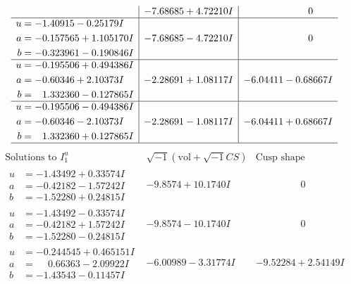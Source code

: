 \documentclass[1p]{elsarticle_modified}
\theoremstyle{definition}
\newcommand{\I}{\sqrt{-1}}
\begin{document}
$$\begin{array}{c|c|c}
 & -7.68685 + 4.72210 I & \phantom{-0.000000 } 0 \\ \hline\begin{aligned}
u &= -1.40915 - 0.25179 I \\
a &= -0.157565 + 1.105170 I \\
b &= -0.323961 - 0.190846 I\end{aligned}
 & -7.68685 - 4.72210 I & \phantom{-0.000000 } 0 \\ \hline\begin{aligned}
u &= -0.195506 + 0.494386 I \\
a &= -0.60346 + 2.10373 I \\
b &= \phantom{-}1.332360 - 0.127865 I\end{aligned}
 & -2.28691 + 1.08117 I & -6.04411 - 0.68667 I \\ \hline\begin{aligned}
u &= -0.195506 - 0.494386 I \\
a &= -0.60346 - 2.10373 I \\
b &= \phantom{-}1.332360 + 0.127865 I\end{aligned}
 & -2.28691 - 1.08117 I & -6.04411 + 0.68667 I\\
 \hline 
 \end{array}$$\newpage$$\begin{array}{c|c|c}  
\text{Solutions to }I^u_{1}& \I (\text{vol} + \sqrt{-1}CS) & \text{Cusp shape}\\
 \hline 
\begin{aligned}
u &= -1.43492 + 0.33574 I \\
a &= -0.42182 - 1.57242 I \\
b &= -1.52280 + 0.24815 I\end{aligned}
 & -9.8574 + 10.1740 I & \phantom{-0.000000 } 0 \\ \hline\begin{aligned}
u &= -1.43492 - 0.33574 I \\
a &= -0.42182 + 1.57242 I \\
b &= -1.52280 - 0.24815 I\end{aligned}
 & -9.8574 - 10.1740 I & \phantom{-0.000000 } 0 \\ \hline\begin{aligned}
u &= -0.244545 + 0.465151 I \\
a &= \phantom{-}0.66363 - 2.09922 I \\
b &= -1.43543 - 0.11457 I\end{aligned}
 & -6.00989 - 3.31774 I & -9.52284 + 2.54149 I \\ \hline\begin{aligned}

\end{aligned}
\end{array}$$
\end{document}
